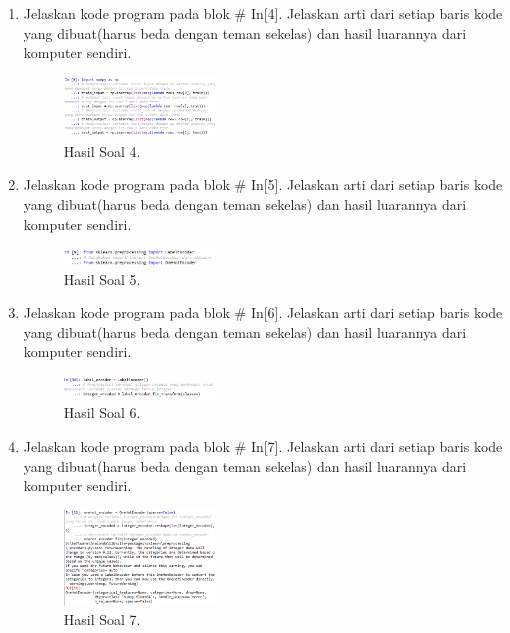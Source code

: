 \begin{enumerate}
	\item Jelaskan kode program pada blok \# In[4]. Jelaskan arti dari setiap baris kode yang dibuat(harus beda dengan teman sekelas) dan hasil luarannya dari komputer sendiri.
	\hfill\break
	
	\begin{figure}[H]
	\centering
		\includegraphics[width=4cm]{figures/1174077/7/praktek_4.PNG}
		\caption{Hasil Soal 4.}
	\end{figure}

	\item Jelaskan kode program pada blok \# In[5]. Jelaskan arti dari setiap baris kode yang dibuat(harus beda dengan teman sekelas) dan hasil luarannya dari komputer sendiri.
	\hfill\break
	
	\begin{figure}[H]
	\centering
		\includegraphics[width=4cm]{figures/1174077/7/praktek_5.PNG}
		\caption{Hasil Soal 5.}
	\end{figure}

	\item Jelaskan kode program pada blok \# In[6]. Jelaskan arti dari setiap baris kode yang dibuat(harus beda dengan teman sekelas) dan hasil luarannya dari komputer sendiri.
	\hfill\break
	
	\begin{figure}[H]
	\centering
		\includegraphics[width=4cm]{figures/1174077/7/praktek_6.PNG}
		\caption{Hasil Soal 6.}
	\end{figure}

	\item Jelaskan kode program pada blok \# In[7]. Jelaskan arti dari setiap baris kode yang dibuat(harus beda dengan teman sekelas) dan hasil luarannya dari komputer sendiri.
	\hfill\break
	
	\begin{figure}[H]
	\centering
		\includegraphics[width=4cm]{figures/1174077/7/praktek_7.PNG}
		\caption{Hasil Soal 7.}
	\end{figure}


\end{enumerate}
